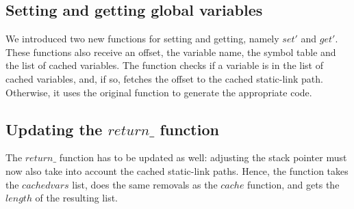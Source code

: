 \documentclass[10pt,a4paper,onecolumn]{article}
\begin{document}
    \subsection {Setting and getting global variables}
	We introduced two new functions for setting and getting, namely $ set' $ and $ get' $.
	These functions also receive an offset, the variable name, the symbol table and the list of cached variables.
	The function checks if a variable is in the list of cached variables, and, if so, fetches the offset to the cached static-link path. Otherwise, it uses the original function to generate the appropriate code.

    \subsection {Updating the $ return\_ $ function}
	The $ return\_ $ function has to be updated as well: adjusting the stack pointer must now also take into account the cached static-link paths.
	Hence, the function takes the $ cachedvars $ list, does the same removals as the $ cache $ function, and gets the $ length $ of the resulting list.

    
\end{document}
